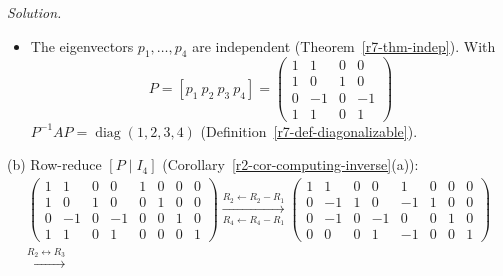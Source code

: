 \documentclass[12pt]{article}
\DeclareMathOperator{\diag}{diag}
\theoremstyle{definition}
\newenvironment{solution}{\par\noindent\textit{Solution.}\ }{\par\smallskip}
\begin{document}
\begin{solution}
\begin{itemize}
\[\begin{gathered}
\xrightarrow[R_3\leftarrow-\frac13R_3]{R_2\leftarrow-R_2}
\begin{pmatrix}2&0&-2&-2\\0&1&2&2\\0&0&1&1\\0&0&-3&-3\end{pmatrix}
\xrightarrow[R_4\leftarrow R_4+3R_3]{R_1\leftarrow R_1+2R_3,\ R_2\leftarrow R_2-2R_3}
\begin{pmatrix}2&0&0&0\\0&1&0&0\\0&0&1&1\\0&0&0&0\end{pmatrix}
\\
\xrightarrow{R_1\leftarrow\frac12R_1}
\begin{pmatrix}1&0&0&0\\0&1&0&0\\0&0&1&1\\0&0&0&0\end{pmatrix}
\end{gathered}
\]
The special solution \(p_4=(0,0,-1,1)'\) is a basis of \(\mathcal N(A-4I)\).
\item The eigenvectors \(p_1,\dots,p_4\) are independent (Theorem~\ref{r7-thm-indep}). With
\[
P=[p_1\ p_2\ p_3\ p_4]=\begin{pmatrix}1&1&0&0\\1&0&1&0\\0&-1&0&-1\\1&1&0&1\end{pmatrix}
\]
\(P^{-1}AP=\diag(1,2,3,4)\) (Definition~\ref{r7-def-diagonalizable}).
\end{itemize}
(b) Row-reduce \([P\mid I_4]\) (Corollary~\ref{r2-cor-computing-inverse}(a)):
\[
\begin{gathered}
\left(\begin{array}{cccc|cccc}1&1&0&0&1&0&0&0\\1&0&1&0&0&1&0&0\\0&-1&0&-1&0&0&1&0\\1&1&0&1&0&0&0&1\end{array}\right)
\xrightarrow[R_4\leftarrow R_4-R_1]{R_2\leftarrow R_2-R_1}
\left(\begin{array}{cccc|cccc}1&1&0&0&1&0&0&0\\0&-1&1&0&-1&1&0&0\\0&-1&0&-1&0&0&1&0\\0&0&0&1&-1&0&0&1\end{array}\right)
\\
\xrightarrow{R_2\leftrightarrow R_3}

\end{gathered}\]
\end{solution}
\end{document}
